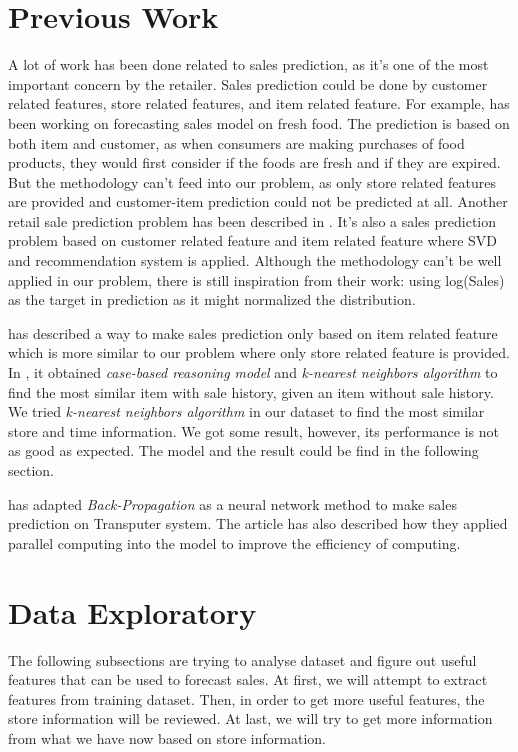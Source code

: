 \documentclass[jou,apacite]{apa6}
\begin{document}
\section{Previous Work}
A lot of work has been done related to sales prediction, as it's one of the most important concern by the retailer. Sales prediction could be done by customer related features, store related features, and item related feature. For example, \cite{chen2010study} has been working on forecasting sales model on fresh food. The prediction is based on both item and customer, as when consumers are making purchases of food products, they would first consider if the foods are fresh and if they are expired. But the methodology can't feed into our problem, as only store related features are provided and customer-item prediction could not be predicted at all. Another retail sale prediction problem has been described in \cite{giering2008retail}. It's also a sales prediction problem based on customer related feature and item related feature where SVD and recommendation system is applied. Although the methodology can't be well applied in our problem, there is still inspiration from their work: using log(Sales) as the target in prediction as it might normalized the distribution.

\cite{chang2008fuzzy} has described a way to make sales prediction only based on item related feature which is more similar to our problem where only store related feature is provided. In \cite{chang2008fuzzy}, it obtained \textit{ case-based reasoning model} and \textit{k-nearest neighbors algorithm} to find the most similar item with sale history, given an item without sale history. We tried \textit{k-nearest neighbors algorithm} in our dataset to find the most similar store and time information. We got some result, however, its performance is not as good as expected. The model and the result could be find in the following section. 

\cite{thiesing1995parallel} has adapted \textit{Back-Propagation} as a neural network method to make sales prediction on Transputer system. The article has also described how they applied parallel computing into the model to improve the efficiency of computing.



\section{Data Exploratory}
The following subsections are trying to analyse dataset and figure out useful features that can be used to forecast sales. At first, we will attempt to extract features from training dataset. Then, in order to get more useful features, the store information will be reviewed. At last, we will try to get more information from what we have now based on store information.
\end{document}
